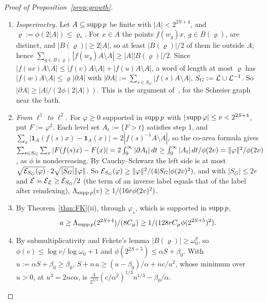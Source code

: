 \begin{proof}[Proof of Proposition~\ref{prop:growth}]
\begin{enumerate}[label=\arabic*.,itemsep=1pt]
\item \emph{Isoperimetry.} Let $A\subseteq\operatorname{supp} p$ be finite with $|A|<2^{2S+4}$, and $\varrho:=\phi(2|A|)\le\varrho_*$. For $x\in A$ the points $f(w_g)x$, $g\in B(\varrho)$, are
distinct, and $|B(\varrho)|\ge2|A|$, so at least $|B(\varrho)|/2$ of them lie outside $A$; hence $\sum_{g\in B(\varrho)}|f(w_g)A\setminus A|\ge|A||B(\varrho)|/2$. Since
$|f(uv)A\setminus A|\le|f(v)A\setminus A|+|f(u)A\setminus A|$, a word of length at most $\varrho$ has $|f(w)A\setminus A|\le\varrho|\partial A|$ with
$|\partial A|:=\sum_{s\in S_G}|f(s)A\setminus A|$, $S_G:=\mathcal L\cup\mathcal L^{-1}$. So $|\partial A|\ge|A|/(2\phi(2|A|))$. This is the argument
of~\cite[Th\'eor\`eme~1]{CoulhonSaloffCoste1993}, for the Schreier graph near the bath.
\item \emph{From $\ell^1$ to $\ell^2$.} For $\varphi\ge0$ supported in $\operatorname{supp} p$ with $|\operatorname{supp}\varphi|\le v<2^{2S+4}$, put $F:=\varphi^2$. Each level set $A_t:=\{F>t\}$ satisfies step 1,
and $\sum_x|\mathbf 1_A(f(s)x)-\mathbf 1_A(x)|=2|f(s)^{-1}A\setminus A|$, so the co-area formula gives
$\sum_{s\in S_G}\sum_x|F(f(s)x)-F(x)|=2\int_0^\infty|\partial A_t|\,dt\ge\int_0^\infty|A_t|\,dt/\phi(2v)=\lVert \varphi\rVert^2/\phi(2v)$, as $\phi$ is nondecreasing. By Cauchy--Schwarz the left
side is at most $\sqrt{\mathcal E_{S_G}(\varphi)}\cdot2\sqrt{|S_G|}\lVert \varphi\rVert$. So $\mathcal E_{S_G}(\varphi)\ge\lVert \varphi\rVert^2/(4|S_G|\phi(2v)^2)$, and with $|S_G|\le2r$ and
$\mathcal E=\mathcal E_\mathcal L\ge\mathcal E_{S_G}/2$ (the term of an inverse label equals that of the label after reindexing), $\Lambda_{\operatorname{supp} p}(v)\ge1/(16r\phi(2v)^2)$.
\item By Theorem~\ref{thm:FK}(ii), through $\varphi_s$, which is supported in $\operatorname{supp} p$,
\[
a\ge\Lambda_{\operatorname{supp} p}(2^{2S+4})/(8C_\mu)\ge1/(128rC_\mu\phi(2^{2S+5})^2).
\]
\item By submultiplicativity and Fekete's lemma $|B(\varrho)|\ge\omega_0^\varrho$, so $\phi(v)\le\log v/\log\omega_0+1$ and $\phi(2^{2S+5})\le\alpha S+\beta_0$. With
$u:=\alpha S+\beta_0\ge\beta_0$, $S+n\,a\ge(u-\beta_0)/\alpha+nc/u^2$, whose minimum over $u>0$, at $u^3=2nc\alpha$, is $\frac3{2^{2/3}}(c/\alpha^2)^{1/3}n^{1/3}-\beta_0/\alpha$.\qedhere
\end{enumerate}
\end{proof}
